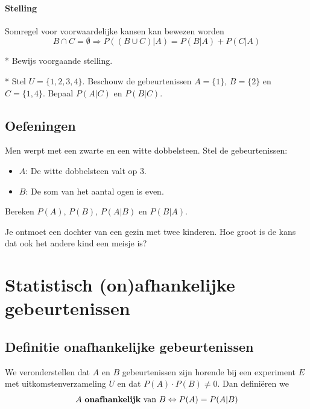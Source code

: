 \documentclass[12pt,twoside]{article}
\begin{document}
\paragraph*{Stelling} Somregel voor voorwaardelijke kansen kan bewezen worden
$$B\cap C=\emptyset \Rightarrow P((B\cup C)|A)=P(B|A)+P(C|A)$$

\begin{oefening}*
Bewijs voorgaande stelling.
\end{oefening}

\begin{oefening}*
Stel $U=\{1,2,3,4\}$. Beschouw de gebeurtenissen $A=\{1\}$, $B=\{2\}$ en $C=\{1,4\}$. Bepaal $P(A|C)$ en $P(B|C)$.
\end{oefening}

\subsection{Oefeningen}

\begin{oefening}
Men werpt met een zwarte en een witte dobbelsteen. Stel de gebeurtenissen:
\begin{itemize}
  \item $A$: De witte dobbelsteen valt op 3.
	\item $B$: De som van het aantal ogen is even.
\end{itemize}
Bereken $P(A)$, $P(B)$, $P(A|B)$ en $P(B|A)$.
\end{oefening}

\begin{oefening}
Je ontmoet een dochter van een gezin met twee kinderen. Hoe groot is de kans dat ook het andere kind een meisje is?
\end{oefening}

\newpage
\section{Statistisch (on)afhankelijke gebeurtenissen}

\subsection{Definitie onafhankelijke gebeurtenissen}

We veronderstellen dat $A$ en $B$ gebeurtenissen zijn horende bij een experiment $E$ met uitkomstenverzameling $U$ en dat $P(A)\cdot P(B) \neq 0$. Dan definiëren we
$$A \mbox{ {\bf onafhankelijk} van } B \Leftrightarrow P(A)=P(A|B)$$
\end{document}
